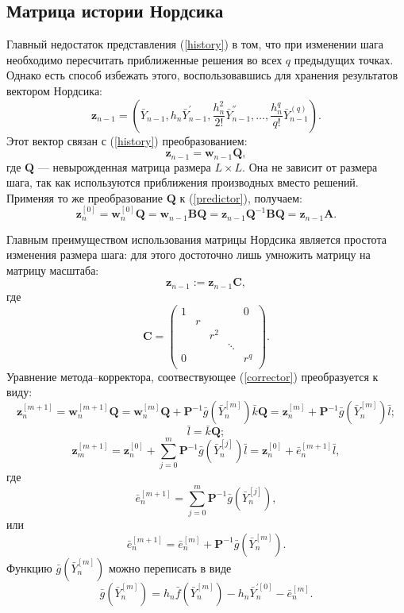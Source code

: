 \documentclass[oneside,final,14pt]{extreport}
\begin{document}
\subsection{Матрица истории Нордсика}
Главный недостаток представления (\ref{history}) в том, что при изменении шага необходимо пересчитать приближенные решения во всех \(q\) предыдущих точках. Однако есть способ избежать этого, воспользовавшись для хранения результатов вектором Нордсика:
\[\mathbf z_{n-1}=\left(\bar Y_{n-1},h_n\bar Y_{n-1}^{'}, \frac{h_n^2}{2!}\bar Y_{n-1}^{''},\ldots,\frac{h_n^q}{q!}\bar Y_{n-1}^{(q)}\right).\]
Этот вектор связан с (\ref{history}) преобразованием:
\[\mathbf z_{n-1}=\mathbf w_{n-1} \mathbf Q,\]
где \(\mathbf Q\) --- невырожденная матрица размера \(L \times L\). Она не зависит от размера шага, так как используются приближения производных вместо решений. Применяя то же преобразование \(\mathbf Q\) к (\ref{predictor}), получаем:
\[
\mathbf z_n^{[0]}=\mathbf w_n^{[0]}\mathbf Q=\mathbf w_{n-1}\mathbf{B Q}=\mathbf z_{n-1}\mathbf Q^{-1}\mathbf{B Q}=\mathbf z_{n-1}\mathbf A
.\]

Главным преимуществом использования матрицы Нордсика является простота изменения размера шага: для этого достоточно лишь умножить матрицу на матрицу масштаба:
\[\mathbf z_{n-1}:=\mathbf z_{n-1} \mathbf C,\]
где
\[\mathbf C=
\begin{pmatrix}
	1 &   & & & 0\\
	  & r & & &\\
	  &   & r^2 & &\\
	  &   &  & \ddots &\\
	0 &   &  &  & r^q\\
\end{pmatrix}.
\]
Уравнение метода--корректора, соотвествующее (\ref{corrector}) преобразуется к виду:
\[
\mathbf z_n^{[m+1]}=\mathbf w_n^{[m+1]}\mathbf Q=\mathbf w_n^{[m]}\mathbf Q+\mathbf P^{-1}\bar g(\bar Y_n^{[m]})\bar k\mathbf Q=\mathbf z_{n}^{[m]}+\mathbf P^{-1}\bar g(\bar Y_n^{[m]})\bar l;
\]
\[
\bar l=\bar k\mathbf Q;
\]
\begin{equation}
\label{nordseick:iteration}
\mathbf z_m^{[m+1]}=\mathbf z_n^{[0]}+\sum_{j=0}^m\mathbf P^{-1}\bar g(\bar Y_n^{[j]})\bar l=\mathbf z_n^{[0]}+\bar e_n^{[m+1]}\bar l
,\end{equation}
где
\[\bar e_n^{[m+1]}=\sum_{j=0}^m\mathbf P^{-1}\bar g(\bar Y_n^{[j]}),\]
или
\[\bar e_n^{[m+1]}=\bar e_n^{[m]}+\mathbf P^{-1}\bar g(\bar Y_n^{[m]}).\]
Функцию \(\bar g(\bar Y_n^{[m]})\) можно переписать в виде
\[\bar g(\bar Y_n^{[m]})=h_n\bar f(\bar Y_n^{[m]})-h_n\bar Y_n^{'[0]}-\bar e_n^{[m]}.\]
\end{document}
